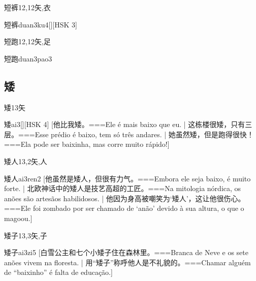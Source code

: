 \begin{Entry}{短裤}{12,12}{⽮,⾐}
  \begin{Phonetics}{短裤}{duan3ku4}[][HSK 3]
  \end{Phonetics}
\end{Entry}

\begin{Entry}{短跑}{12,12}{⽮,⾜}
  \begin{Phonetics}{短跑}{duan3pao3}
  \end{Phonetics}
\end{Entry}

\subsection*{矮}

\begin{Entry}{矮}{13}{⽮}
  \begin{Phonetics}{矮}{ai3}[][HSK 4]
    [他比我矮。===Ele é mais baixo que eu. | 这栋楼很矮，只有三层。===Esse prédio é baixo, tem só três andares. | 她虽然矮，但是跑得很快！===Ela pode ser baixinha, mas corre muito rápido!]
  \end{Phonetics}
\end{Entry}

\begin{Entry}{矮人}{13,2}{⽮,⼈}
  \begin{Phonetics}{矮人}{ai3ren2}
    [他虽然是矮人，但很有力气。===Embora ele seja baixo, é muito forte. | 北欧神话中的矮人是技艺高超的工匠。===Na mitologia nórdica, os anões são artesãos habilidosos. | 他因为身高被嘲笑为‘矮人’，这让他很伤心。===Ele foi zombado por ser chamado de ‘anão’ devido à sua altura, o que o magoou.]
  \end{Phonetics}
\end{Entry}

\begin{Entry}{矮子}{13,3}{⽮,⼦}
  \begin{Phonetics}{矮子}{ai3zi5}
    [白雪公主和七个小矮子住在森林里。===Branca de Neve e os sete anões vivem na floresta. | 用``矮子''称呼他人是不礼貌的。===Chamar alguém de ``baixinho'' é falta de educação.]
  \end{Phonetics}
\end{Entry}

